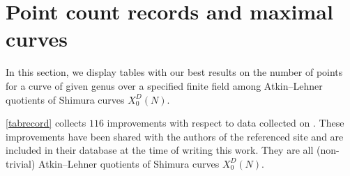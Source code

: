 \documentclass[11pt,reqno]{amsart}
\theoremstyle{definition}
\begin{document}


\section{Point count records and maximal curves}\label{section: maximal_curves}

In this section, we display tables with our best results on the number of points for a curve of given genus over a specified finite field among Atkin--Lehner quotients of Shimura curves $X_0^D(N)$.%

\cref{tabrecord} collects $116$ improvements with respect to data collected on \cite{ManyPoints}. These improvements have been shared with the authors of the referenced site and are included in their database at the time of writing this work. They are all (non-trivial) Atkin--Lehner quotients of Shimura curves $X_0^D(N)$.%
\end{document}
